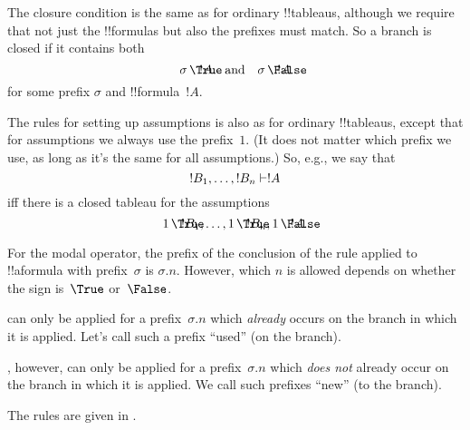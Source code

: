 \documentclass[../../../include/open-logic-section]{subfiles}
\begin{document}
The closure condition is the same as for ordinary !!{tableau}s,
although we require that not just the !!{formula}s but also the
prefixes must match. So a branch is closed if it contains both
\[
\sFmla{\True}{!A}[\sigma] \quad\text{and}\quad \sFmla{\False}{!A}[\sigma]
\]
for some prefix $\sigma$ and !!{formula}~$!A$.

The rules for setting up assumptions is also as for ordinary
!!{tableau}s, except that for assumptions we always use the
prefix~$1$. (It does not matter which prefix we use, as long as it's
the same for all assumptions.) So, e.g., we say that
\[
!B_1, \dots, !B_n \Proves !A
\]
iff there is a closed tableau for the assumptions
\[
\sFmla{\True}{!B_1}[1], \dots, \sFmla{\True}{!B_n}[1],
\sFmla{\False}{!A}[1].
\]

For the modal operator, the prefix of
the conclusion of the rule applied to !!a{formula} with
prefix~$\sigma$ is $\sigma.n$. However, which $n$ is allowed depends
on whether the sign is~$\True$ or~$\False$.

 can only be applied for a
prefix~$\sigma.n$ which \emph{already} occurs on the branch in which
it is applied. Let's call such a prefix ``used'' (on the branch).

, however, can
only be applied for a prefix~$\sigma.n$ which \emph{does not} already
occur on the branch in which it is applied. We call such prefixes
``new'' (to the branch).

The rules are given in .
\end{document}
